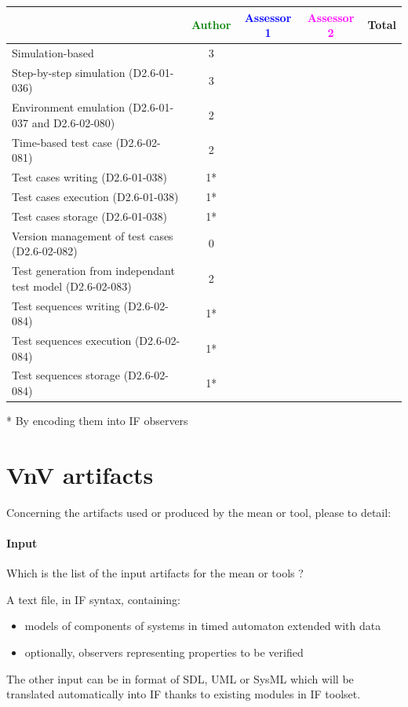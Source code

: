 \begin{tabular}{|l | c | c | c | c|}
\hline
& \textcolor{green}{Author} & \textcolor{blue}{Assessor 1} & \textcolor{magenta}{Assessor 2} & Total \\
\hline 
Simulation-based & 3 & & &  \\
\hline
Step-by-step simulation (D2.6-01-036) & 3 & & &  \\
\hline
Environment emulation (D2.6-01-037 and D2.6-02-080) & 2 & & &  \\
\hline
Time-based test case (D2.6-02-081) & 2 & & &  \\
\hline
Test cases writing (D2.6-01-038) & 1* & & &  \\
\hline
Test cases execution (D2.6-01-038) & 1* & & &  \\
\hline
Test cases storage (D2.6-01-038) & 1* & & &  \\
\hline
Version management of test cases (D2.6-02-082) & 0 & & &  \\
\hline
Test generation from independant test model (D2.6-02-083) & 2 & & &  \\
\hline
Test sequences writing (D2.6-02-084) & 1* & & &  \\
\hline
Test sequences execution (D2.6-02-084) & 1* & & &  \\
\hline
Test sequences storage (D2.6-02-084) & 1* & & &  \\
\hline
\end{tabular}

\begin{author_comment}
 * By encoding them into IF observers

\end{author_comment}

\section{VnV artifacts}


Concerning the artifacts used or produced by the mean or tool, please to detail:

\paragraph{Input}
    Which is the list of the input artifacts for the mean or tools ?
    
\begin{author_comment}

	A text file, in IF syntax, containing:
\begin{itemize}
	\item models of components of systems in timed automaton extended with data
	\item optionally, observers representing properties to be verified
\end{itemize}

The other input can be in format of  SDL, UML or SysML which will be translated automatically into IF thanks to existing modules in IF toolset.

\end{author_comment}
    
